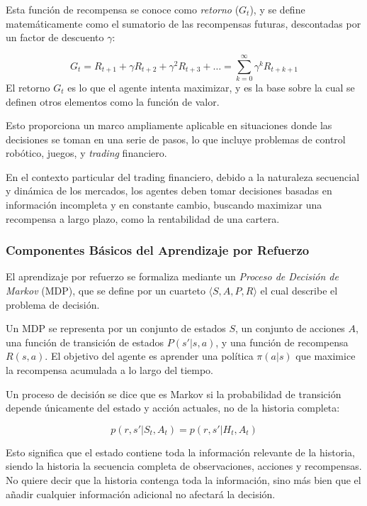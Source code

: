 \documentclass[a4paper,12pt, twoside]{report}
\begin{document}
Esta función de recompensa se conoce como \textit{retorno} (\(G_t\)), y se define matemáticamente como el sumatorio
de las recompensas futuras, descontadas por un factor de descuento  \(\gamma\):

\[
G_t = R_{t+1} + \gamma R_{t+2} + \gamma^2 R_{t+3} + \dots = \sum_{k=0}^{\infty} \gamma^k R_{t+k+1}
\]
El retorno \(G_t\) es lo que el agente intenta maximizar, y es la base sobre la cual se definen otros elementos como la función de valor.


Esto proporciona un marco ampliamente aplicable en situaciones donde 
las decisiones se toman en una serie de pasos, lo que incluye problemas de control robótico, juegos, 
y \textit{trading} financiero.

En el contexto particular del trading financiero, debido a la naturaleza secuencial y dinámica de 
los mercados, los agentes deben tomar decisiones basadas en información incompleta y en constante 
cambio, buscando maximizar una recompensa a largo plazo, como la rentabilidad de una cartera.


\subsubsection{Componentes Básicos del Aprendizaje por Refuerzo}

El aprendizaje por refuerzo se formaliza mediante un \textit{Proceso de Decisión de Markov} (MDP), 
que se define por un cuarteto \(\langle S, A, P, R \rangle\) el cual describe el problema de decisión.

Un MDP se representa por un conjunto de estados \(S\), 
un conjunto de acciones \(A\), una función de transición de estados \(P(s'|s, a)\), y una función de 
recompensa \(R(s, a)\). El objetivo del agente es aprender una política \(\pi(a|s)\) que maximice la 
recompensa acumulada a lo largo del tiempo.

Un proceso de decisión se dice que es Markov si la probabilidad de transición depende únicamente
del estado y acción actuales, no de la historia completa:

\[
p(r, s' | S_t, A_t) = p(r, s' | H_t, A_t)
\]

Esto significa que el estado contiene toda la información relevante de la historia, siendo la historia 
la secuencia completa de observaciones, acciones y recompensas. No quiere decir que la historia contenga
toda la información, sino más bien que el añadir cualquier información adicional no afectará la decisión.
\end{document}
